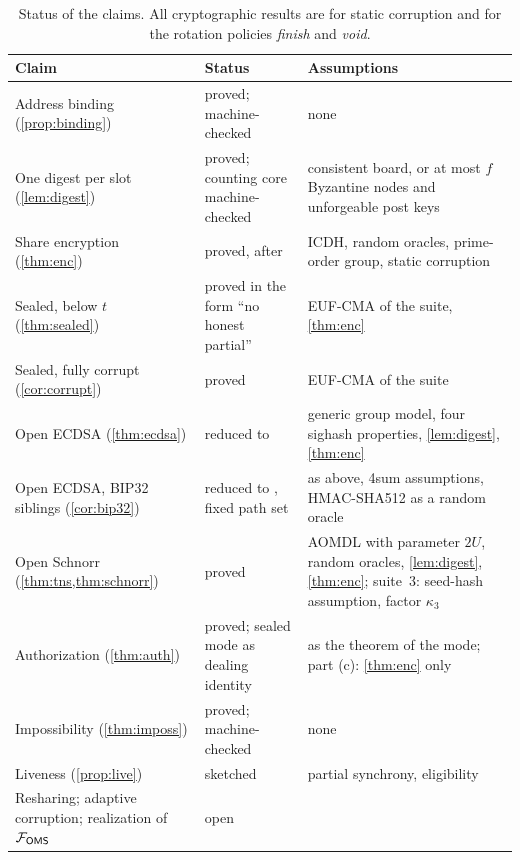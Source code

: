 \begin{table}[t]
\centering
\small
\begin{tabularx}{\linewidth}{@{}l>{\raggedright\arraybackslash}X>{\raggedright\arraybackslash}X@{}}
\toprule
Claim & Status & Assumptions \\
\midrule
Address binding (\cref{prop:binding}) & proved; machine-checked & none \\
One digest per slot (\cref{lem:digest}) & proved; counting core machine-checked & consistent board, or at most $f$ Byzantine nodes and unforgeable post keys \\
Share encryption (\cref{thm:enc}) & proved, after \cite[Theorem~2]{GS22} & ICDH, random oracles, prime-order group, static corruption \\
Sealed, below $t$ (\cref{thm:sealed}) & proved in the form ``no honest partial'' & EUF-CMA of the suite, \cref{thm:enc} \\
Sealed, fully corrupt (\cref{cor:corrupt}) & proved & EUF-CMA of the suite \\
Open ECDSA (\cref{thm:ecdsa}) & reduced to \cite[Theorem~3]{GS21} & generic group model, four sighash properties, \cref{lem:digest}, \cref{thm:enc} \\
Open ECDSA, BIP32 siblings (\cref{cor:bip32}) & reduced to \cite[Theorem~4]{GS21}, fixed path set & as above, 4sum assumptions, HMAC-SHA512 as a random oracle \\
Open Schnorr (\cref{thm:tns,thm:schnorr}) & proved & AOMDL with parameter $2U$, random oracles, \cref{lem:digest}, \cref{thm:enc}; suite~3: seed-hash assumption, factor $\kappa_3$ \\
Authorization (\cref{thm:auth}) & proved; sealed mode as dealing identity & as the theorem of the mode; part (c): \cref{thm:enc} only \\
Impossibility (\cref{thm:imposs}) & proved; machine-checked & none \\
Liveness (\cref{prop:live}) & sketched & partial synchrony, eligibility \\
Resharing; adaptive corruption; realization of $\mathcal{F}_{\mathsf{OMS}}$ & open & \\
\bottomrule
\end{tabularx}
\caption{Status of the claims. All cryptographic results are for static corruption and for the rotation policies \emph{finish} and \emph{void}.}
\label{tab:status}
\end{table}

